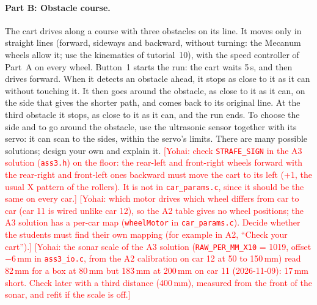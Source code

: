 \documentclass[11pt,a4paper]{article}
\newcommand{\flag}[1]{\textcolor{red}{[#1]}}
\begin{document}
\paragraph{Part B: Obstacle course.}
The cart drives along a course with three obstacles on its line. It moves only in straight lines (forward, sideways
and backward, without turning: the Mecanum wheels allow it; use the kinematics of tutorial~10), with the speed
controller of Part~A on every wheel. Button~1 starts the run: the cart waits 5\,s, and then drives forward. When it
detects an obstacle ahead, it stops as close to it as it can without touching it. It then goes around the obstacle, as
close to it as it can, on the side that gives the shorter path, and comes back to its original line. At the third
obstacle it stops, as close to it as it can, and the run ends.
To choose the side and to go around the obstacle, use the ultrasonic sensor together with its servo: it can scan to
the sides, within the servo's limits. There are many possible solutions; design your own and explain it.
\flag{Yohai: check \texttt{STRAFE\_SIGN} in the A3 solution (\texttt{ass3.h}) on the floor: the rear-left and front-right
wheels forward with the rear-right and front-left ones backward must move the cart to its left (+1, the usual X pattern of the rollers). It is not in
\texttt{car\_params.c}, since it should be the same on every car.}
\flag{Yohai: which motor drives which wheel differs from car to car (car 11 is wired unlike car 12), so the A2
table gives no wheel positions; the A3 solution has a per-car map (\texttt{wheelMotor} in \texttt{car\_params.c}).
Decide whether the students must find their own mapping (for example in A2, ``Check your cart'').}
\flag{Yohai: the sonar scale of the A3 solution (\texttt{RAW\_PER\_MM\_X10} = 1019, offset $-6$\,mm in
\texttt{ass3\_io.c}, from the A2 calibration on car 12 at 50 to 150\,mm) read 82\,mm for a box at 80\,mm but 183\,mm
at 200\,mm on car 11 (2026-11-09): 17\,mm short. Check later with a third distance (400\,mm), measured from the
front of the sonar, and refit if the scale is off.}
\end{document}
